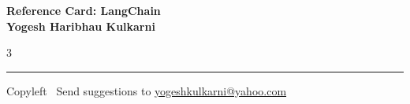 \documentclass[8pt,landscape]{article}
\begin{document}
\footnotesize


\begin{center}
\Large{\textbf{Reference Card: LangChain\\ Yogesh Haribhau Kulkarni}}  
\end{center}

\begin{multicols}{3}

\end{multicols}

\rule{\linewidth}{0.25pt}
\scriptsize
Copyleft \textcopyleft\  Send suggestions to 
\href{http://www.yogeshkulkarni.com}{yogeshkulkarni@yahoo.com}
\end{document}
